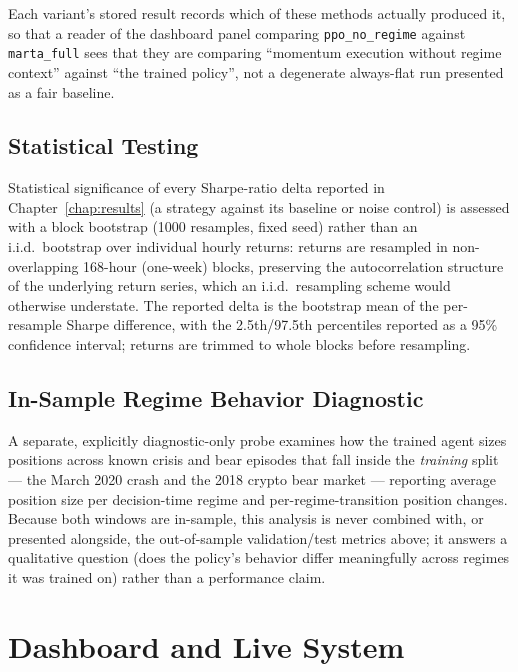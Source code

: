 Each variant's stored result records which of these methods actually produced it, so that a reader of the dashboard panel comparing \texttt{ppo\_no\_regime} against \texttt{marta\_full} sees that they are comparing ``momentum execution without regime context'' against ``the trained policy'', not a degenerate always-flat run presented as a fair baseline.

\subsection{Statistical Testing}
\label{subsec:eval-bootstrap}

Statistical significance of every Sharpe-ratio delta reported in Chapter~\ref{chap:results} (a strategy against its baseline or noise control) is assessed with a block bootstrap \cite{efron1979,kunsch1989} (1000 resamples, fixed seed) rather than an i.i.d.\ bootstrap over individual hourly returns: returns are resampled in non-overlapping 168-hour (one-week) blocks, preserving the autocorrelation structure of the underlying return series, which an i.i.d.\ resampling scheme would otherwise understate. The reported delta is the bootstrap mean of the per-resample Sharpe difference, with the 2.5th/97.5th percentiles reported as a 95\% confidence interval; returns are trimmed to whole blocks before resampling.

\subsection{In-Sample Regime Behavior Diagnostic}
\label{subsec:eval-in-sample}

A separate, explicitly diagnostic-only probe examines how the trained agent sizes positions across known crisis and bear episodes that fall inside the \emph{training} split --- the March 2020 crash and the 2018 crypto bear market --- reporting average position size per decision-time regime and per-regime-transition position changes. Because both windows are in-sample, this analysis is never combined with, or presented alongside, the out-of-sample validation/test metrics above; it answers a qualitative question (does the policy's behavior differ meaningfully across regimes it was trained on) rather than a performance claim.

\section{Dashboard and Live System}
\label{sec:dashboard-methodology}

